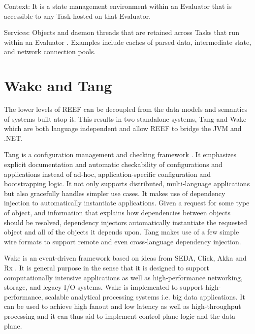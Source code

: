 \documentclass[9pt,twocolumn,twoside]{styles/osajnl}
\begin{document}
Context: It is a state management environment within an Evaluator that is accessible to any Task hosted on that Evaluator.

Services: Objects and  daemon threads that are retained across Tasks that run within an Evaluator \cite{reefpaper}. Examples include caches of parsed data, intermediate state, and network connection pools.


\section{Wake and Tang}

The lower levels of REEF can be decoupled from the data models and semantics of systems built atop it. This results in two standalone systems, Tang and Wake which are both language independent and allow REEF to bridge the JVM and .NET.\newline

Tang is a configuration management and checking framework \cite{reeftang}. It emphasizes explicit documentation and automatic checkability of configurations and applications instead of ad-hoc, application-specific configuration and bootstrapping logic. It not only supports distributed, multi-language applications but also gracefully handles simpler use cases. It makes use of dependency injection to automatically instantiate applications. Given a request for some type of object, and information that explains how dependencies between objects should be resolved, dependency injectors automatically instantiate the requested object and all of the objects it depends upon. Tang makes use of a few simple wire formats to support remote and even cross-language dependency injection.\newline

Wake is an event-driven framework based on ideas from SEDA, Click, Akka and Rx \cite{reefwake}. It is general purpose in the sense that it is designed to support computationally intensive applications as well as high-performance networking, storage, and legacy I/O systems. Wake is implemented to support high-performance, scalable analytical processing systems i.e. big data applications. It can be used to achieve high fanout and low latency as well as high-throughput processing and it can thus aid to implement control plane logic and the data plane.



\end{document}

